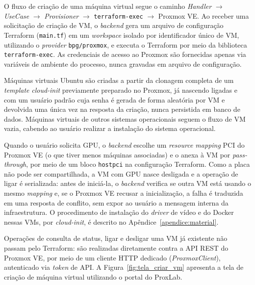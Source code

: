 O fluxo de criação de uma máquina virtual segue o caminho \textit{Handler} \(\rightarrow\) \textit{UseCase} \(\rightarrow\) \textit{Provisioner} \(\rightarrow\) \texttt{terraform-exec} \(\rightarrow\) Proxmox VE. Ao receber uma solicitação de criação de VM, o \textit{backend} gera um arquivo de configuração Terraform (\texttt{main.tf}) em um \textit{workspace} isolado por identificador único de VM, utilizando o \textit{provider} \texttt{bpg/proxmox}, e executa o Terraform por meio da biblioteca \texttt{terraform-exec}. As credenciais de acesso ao Proxmox são fornecidas apenas via variáveis de ambiente do processo, nunca gravadas em arquivo de configuração.\\

\par Máquinas virtuais Ubuntu são criadas a partir da clonagem completa de um \textit{template} \textit{cloud-init} previamente preparado no Proxmox, já nascendo ligadas e com um usuário padrão cuja senha é gerada de forma aleatória por VM e devolvida uma única vez na resposta da criação, nunca persistida em banco de dados. Máquinas virtuais de outros sistemas operacionais seguem o fluxo de VM vazia, cabendo ao usuário realizar a instalação do sistema operacional.\\

\par Quando o usuário solicita GPU, o \textit{backend} escolhe um \textit{resource mapping} PCI do Proxmox VE (o que tiver menos máquinas associadas) e o anexa à VM por \textit{pass-through}, por meio de um bloco \texttt{hostpci} na configuração Terraform. Como a placa não pode ser compartilhada, a VM com GPU nasce desligada e a operação de ligar é serializada: antes de iniciá-la, o \textit{backend} verifica se outra VM está usando o mesmo \textit{mapping} e, se o Proxmox VE recusar a inicialização, a falha é traduzida em uma resposta de conflito, sem expor ao usuário a mensagem interna da infraestrutura. O procedimento de instalação do \textit{driver} de vídeo e do Docker nessas VMs, por \textit{cloud-init}, é descrito no Apêndice~\ref{apendice:material}.\\

\par Operações de consulta de status, ligar e desligar uma VM já existente não passam pelo Terraform: são realizadas diretamente contra a API REST do Proxmox VE, por meio de um cliente HTTP dedicado (\textit{ProxmoxClient}), autenticado via \textit{token} de API. A Figura~\ref{fig:tela_criar_vm} apresenta a tela de criação de máquina virtual utilizando o portal do ProxLab.

